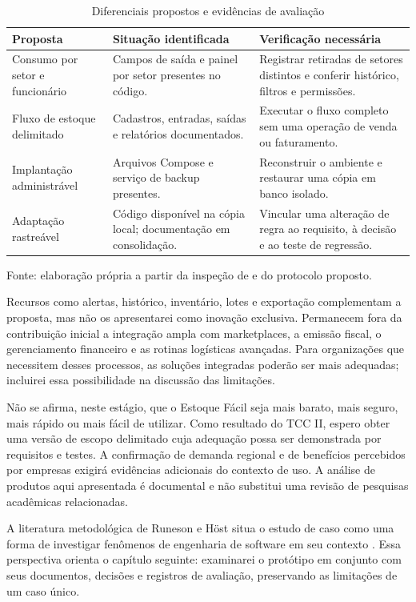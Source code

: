 \begin{table}[htb]
\centering
\caption{Diferenciais propostos e evidências de avaliação}
\label{tab:diferenciais}
\small
\begin{tabular}{p{}p{}p{}}
\hline
\textbf{Proposta} & \textbf{Situação identificada} & \textbf{Verificação necessária} \\ \hline
Consumo por setor e funcionário & Campos de saída e painel por setor presentes no código. & Registrar retiradas de setores distintos e conferir histórico, filtros e permissões. \\ \hline
Fluxo de estoque delimitado & Cadastros, entradas, saídas e relatórios documentados. & Executar o fluxo completo sem uma operação de venda ou faturamento. \\ \hline
Implantação administrável & Arquivos Compose e serviço de backup presentes. & Reconstruir o ambiente e restaurar uma cópia em banco isolado. \\ \hline
Adaptação rastreável & Código disponível na cópia local; documentação em consolidação. & Vincular uma alteração de regra ao requisito, à decisão e ao teste de regressão. \\ \hline
\end{tabular}
\par\smallskip
{\footnotesize Fonte: elaboração própria a partir da inspeção de \cite{EstoqueFacilRepositorio} e do protocolo proposto.}
\end{table}

Recursos como alertas, histórico, inventário, lotes e exportação complementam a proposta, mas não os apresentarei como inovação exclusiva. Permanecem fora da contribuição inicial a integração ampla com marketplaces, a emissão fiscal, o gerenciamento financeiro e as rotinas logísticas avançadas. Para organizações que necessitem desses processos, as soluções integradas poderão ser mais adequadas; incluirei essa possibilidade na discussão das limitações.

Não se afirma, neste estágio, que o Estoque Fácil seja mais barato, mais seguro, mais rápido ou mais fácil de utilizar. Como resultado do TCC II, espero obter uma versão de escopo delimitado cuja adequação possa ser demonstrada por requisitos e testes. A confirmação de demanda regional e de benefícios percebidos por empresas exigirá evidências adicionais do contexto de uso. A análise de produtos aqui apresentada é documental e não substitui uma revisão de pesquisas acadêmicas relacionadas.

A literatura metodológica de Runeson e Höst situa o estudo de caso como uma forma de investigar fenômenos de engenharia de software em seu contexto \cite{RunesonHost2009}. Essa perspectiva orienta o capítulo seguinte: examinarei o protótipo em conjunto com seus documentos, decisões e registros de avaliação, preservando as limitações de um caso único.
